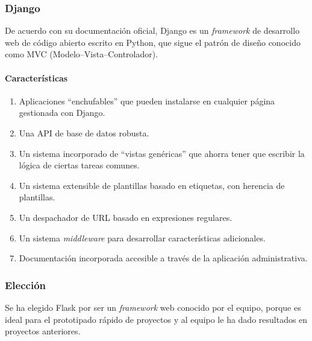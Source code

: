 \subsubsection*{Django}

De acuerdo con su documentación oficial\cite{pallets_projects_flask_2020}, Django es un \textit{framework} de desarrollo web de código abierto escrito en Python, que sigue el patrón de diseño conocido como MVC (Modelo–Vista–Controlador).

\paragraph*{Características}
\begin{enumerate}
    \item Aplicaciones ``enchufables'' que pueden instalarse en cualquier página gestionada con Django.
    \item Una API de base de datos robusta.
    \item Un sistema incorporado de ``vistas genéricas'' que ahorra tener que escribir la lógica de ciertas tareas comunes.
    \item Un sistema extensible de plantillas basado en etiquetas, con herencia de plantillas.
    \item Un despachador de URL basado en expresiones regulares.
    \item Un sistema \textit{middleware} para desarrollar características adicionales.
    \item Documentación incorporada accesible a través de la aplicación administrativa.
\end{enumerate}

\subsubsection*{Elección}

Se ha elegido Flask por ser un \textit{framework} web conocido por el equipo, porque es ideal para el prototipado rápido de proyectos y al equipo le ha dado resultados en proyectos anteriores.